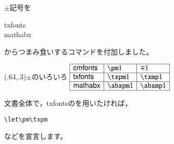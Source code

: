 \documentclass[a4j]{jarticle}
\begin{document}
$\pm$記号を
\begin{jquote}
  \textsf{txfonts}\\
  \textsf{mathabx}\\
\end{jquote}
からつまみ食いするコマンドを付加しました。

\begin{showEx}(.64,.3){$\pm$のいろいろ}
  $\begin{array}{|l|l|l|}\hline
    \textsf{cmfonts} & \pm1 & \mp 1\\\hline
    \textsf{txfonts} & \txpm1 & \txmp1\\\hline
    \textsf{mathabx} & \abxpm1 & \abxmp1\\\hline
  \end{array}$
\end{showEx}

文書全体で，\textsf{txfonts}のを用いたければ，
\begin{jquote}
\begin{verbatim}
\let\pm\txpm
\end{verbatim}
\end{jquote}
などを宣言します。
\end{document}
